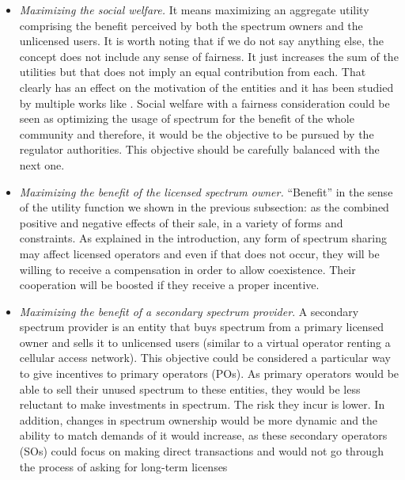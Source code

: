 \begin{itemize}
\item \textit{Maximizing the social welfare.} It means maximizing an aggregate utility comprising the benefit perceived by both the spectrum owners and the unlicensed users. It is worth noting that if we do not say anything else, the concept does not include any sense of fairness. It just increases the sum of the utilities but that does not imply an equal contribution from each. That clearly has an effect on the motivation of the entities and it has been studied by multiple works like \cite{ref:Zhang2012_Fair,ref:Vidal2013,ref:Gopinathan2011,ref:Yu2010}. Social welfare with a fairness consideration could be seen as optimizing the usage of spectrum for the benefit of the whole community and therefore, it would be the objective to be pursued by the regulator authorities. This objective should be carefully balanced with the next one.  
\item \textit{Maximizing the benefit of the licensed spectrum owner.} ``Benefit'' in the sense of the utility function we shown in the previous subsection: as the combined positive and negative effects of their sale, in a variety of forms and constraints. As explained in the introduction, any form of spectrum sharing may affect licensed operators and even if that does not occur, they will be willing to receive a compensation in order to allow coexistence. Their cooperation will be boosted if they receive a proper incentive.  
\item \textit{Maximizing the benefit of a secondary spectrum provider}. A secondary spectrum provider is an entity that buys spectrum from a primary licensed owner and sells it to unlicensed users (similar to a virtual operator renting a cellular access network). This objective could be considered a particular way to give incentives to primary operators (POs). As primary operators would be able to sell their unused spectrum to these entities, they would be less reluctant to make investments in spectrum. The risk they incur is lower. In addition, changes in spectrum ownership would be more dynamic and the ability to match demands of it would increase, as these secondary operators (SOs) could focus on making direct transactions and would not go through the process of asking for long-term licenses

\end{itemize}

